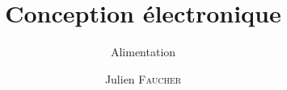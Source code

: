 \documentclass[a4paper,french]{article}
\author{Julien \textsc{Faucher}}
\title{Conception électronique}
\subtitle{Alimentation}
\begin{document}
\makepagegarde
\tableofcontents 
\listoffigures
\cleardoublepage

\end{document}
